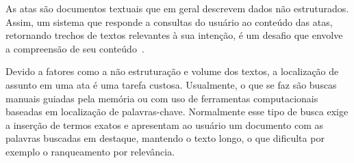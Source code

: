 


















As atas são documentos textuais que em geral descrevem dados não estruturados. Assim, um sistema que responde a consultas do usuário ao conteúdo das atas, retornando trechos de textos relevantes à sua intenção, é um desafio que envolve a compreensão de seu conteúdo~\cite{Bokaei2015}. 










%  
Devido a fatores como a não estruturação e volume dos textos, a localização de assunto em uma ata é uma tarefa custosa.  Usualmente, o que se faz são buscas manuais guiadas pela memória ou com uso de ferramentas computacionais baseadas em localização de palavras-chave.  Normalmente esse tipo de busca exige a inserção de termos exatos e 
apresentam ao usuário um documento com as palavras buscadas em destaque, mantendo o texto longo, o que dificulta por exemplo o ranqueamento por relevância. 

